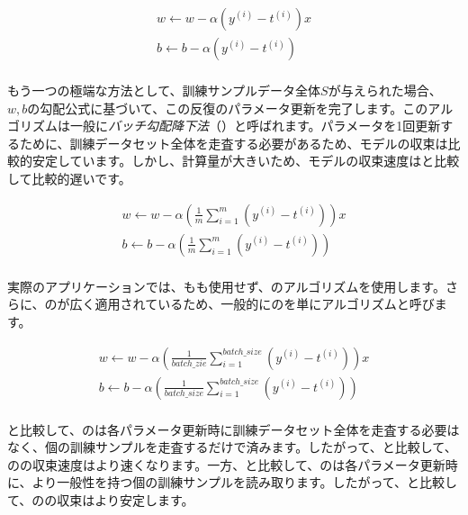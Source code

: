 \begin{content}
\[\begin{gathered}
  w \leftarrow w - \alpha \left( {{y^{(i)}} - {t^{(i)}}} \right)x \\ 
  b \leftarrow b - \alpha \left( {{y^{(i)}} - {t^{(i)}}} \right) \\ 
\end{gathered} \]

もう一つの極端な方法として、訓練サンプルデータ全体$ S $が与えられた場合、$w, b$の勾配公式に基づいて、この反復のパラメータ更新を完了します。このアルゴリズムは一般に\emph{バッチ勾配降下法}（）と呼ばれます。パラメータを1回更新するために、訓練データセット全体を走査する必要があるため、モデルの収束は比較的安定しています。しかし、計算量が大きいため、モデルの収束速度はと比較して比較的遅いです。

\[\begin{gathered}
  w \leftarrow w - \alpha \left( {\frac{1}{m}\sum\limits_{i = 1}^m {\left( {{y^{(i)}} - {t^{(i)}}} \right)} } \right)x \\ 
  b \leftarrow b - \alpha \left( {\frac{1}{m}\sum\limits_{i = 1}^m {\left( {{y^{(i)}} - {t^{(i)}}} \right)} } \right) \\ 
\end{gathered} \]

実際のアプリケーションでは、もも使用せず、のアルゴリズムを使用します。さらに、のが広く適用されているため、一般的にのを単にアルゴリズムと呼びます。

\[\begin{aligned}
  w \leftarrow w - \alpha \left( {\frac{1}{{batch\_zie}}\sum\limits_{i = 1}^{batch\_size} {\left( {{y^{(i)}} - {t^{(i)}}} \right)} } \right)x \\ 
  b \leftarrow b - \alpha \left( {\frac{1}{{batch\_size}}\sum\limits_{i = 1}^{batch\_size} {\left( {{y^{(i)}} - {t^{(i)}}} \right)} } \right) \\ 
\end{aligned} \]

と比較して、のは各パラメータ更新時に訓練データセット全体を走査する必要はなく、個の訓練サンプルを走査するだけで済みます。したがって、と比較して、のの収束速度はより速くなります。一方、と比較して、のは各パラメータ更新時に、より一般性を持つ個の訓練サンプルを読み取ります。したがって、と比較して、のの収束はより安定します。


\end{content}
